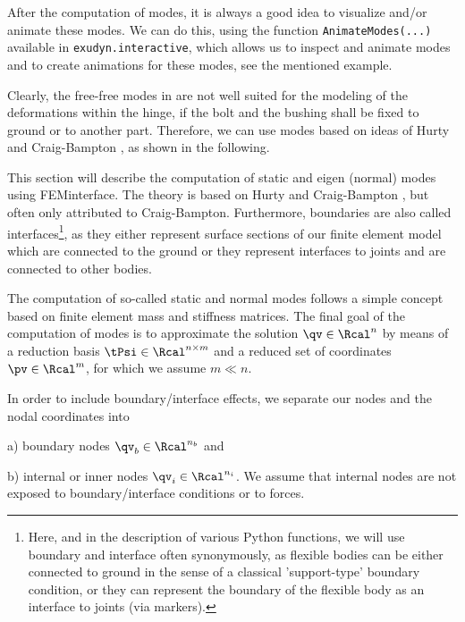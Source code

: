 After the computation of modes, it is always a good idea to visualize and/or animate these modes. We can do this, using the function \texttt{AnimateModes(...)} available in \texttt{exudyn.interactive}, which allows us to inspect and animate modes and to create animations for these modes, see the mentioned example.

Clearly, the free-free modes in  are not well suited for the modeling of the deformations within the hinge, if the bolt and the bushing shall be fixed to ground or to another part. 
Therefore, we can use modes based on ideas of Hurty \cite{Hurty1965} and Craig-Bampton \cite{CraigBampton1968}, as shown in the following.


This section will describe the computation of static and eigen (normal) modes using FEMinterface.
The theory is based on Hurty \cite{Hurty1965} and Craig-Bampton \cite{CraigBampton1968}, but often only attributed to Craig-Bampton.
Furthermore, boundaries are also called interfaces\footnote{Here, and in the description of various Python functions, we will use boundary and interface often synonymously, as flexible bodies can be either connected to ground in the sense of a classical 'support-type' boundary condition, or they can represent the boundary of the flexible body as an interface to joints (via markers).}, as they either represent surface sections of our finite element model which are connected to the ground or they represent interfaces to joints and are connected to other bodies.

The computation of so-called static and normal modes follows a simple concept based on finite element mass and stiffness matrices.
The final goal of the computation of modes is to approximate the solution $\qv \in \Rcal^n$ 
by means of a reduction basis $\tPsi \in \Rcal^{n \times m}$ 
and a reduced set of coordinates $\pv \in \Rcal^m$, for which we assume $m \ll n$.

In order to include boundary/interface effects, we separate our nodes and the nodal coordinates into 
\bi
  \item[] a) boundary nodes $\qv_b \in \Rcal^{n_b}$ and
  \item[] b) internal or inner nodes $\qv_i \in \Rcal^{n_i}$.
\ei
We assume that internal nodes are not exposed to boundary/interface conditions or to forces.

